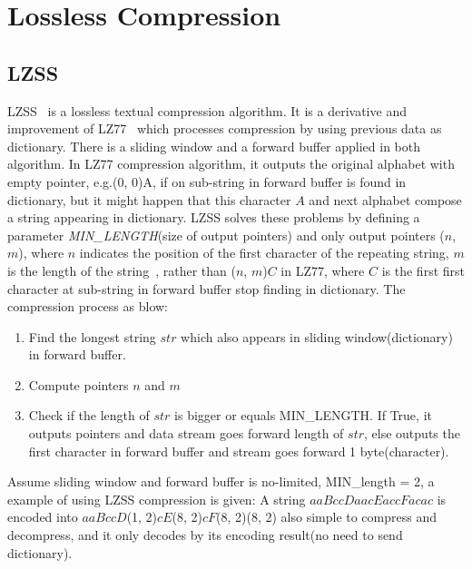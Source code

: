 \section{Lossless Compression}
\subsection{LZSS}
LZSS~\cite{storer1982data} is a lossless textual compression algorithm. It is a
derivative and improvement of LZ77~\cite{ziv1977universal} which processes
compression by using previous data as dictionary. There is a sliding window and
a forward buffer applied in both algorithm. In LZ77 compression algorithm, it
outputs the original alphabet with empty pointer, e.g.(0, 0)A, if on sub-string
in forward buffer is found in dictionary\cite{ziv1977universal}, but it might
happen that this character $A$ and next alphabet compose a string appearing in
dictionary. LZSS solves these problems by defining a parameter
\emph{MIN\_LENGTH}(size of output pointers) and only output pointers ($n$, $m$),
where $n$ indicates the position of the first character of the repeating string,
$m$ is the length of the string~\cite{storer1982data}, rather than ($n$, $m$)$C$
in LZ77, where $C$ is the first first character at sub-string in forward buffer
stop finding in dictionary. The compression process as blow:

\begin{enumerate}
    \item Find the longest string $str$ which also appears in sliding
    window(dictionary) in forward buffer.
    \item Compute pointers $n$ and $m$
    \item Check if the length of $str$ is bigger or equals MIN\_LENGTH. If True,
    it outputs pointers and data stream goes forward length of $str$, else outputs
    the first character in forward buffer and stream goes forward 1
    byte(character).
\end{enumerate}

Assume sliding window and forward buffer is no-limited, MIN\_length = 2, a
example of using LZSS compression is given: A string $aaBccDaacEaccFacac$ is
encoded into $aaBccD$(1, 2)$cE$(8, 2)$cF$(8, 2)(8, 2) also simple to compress
and decompress, and it only decodes by its encoding result(no need to send
dictionary).

